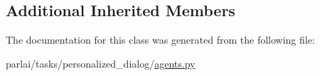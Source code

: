 \subsection*{Additional Inherited Members}


The documentation for this class was generated from the following file\+:\begin{DoxyCompactItemize}
\item 
parlai/tasks/personalized\+\_\+dialog/\hyperlink{parlai_2tasks_2personalized__dialog_2agents_8py}{agents.\+py}\end{DoxyCompactItemize}
